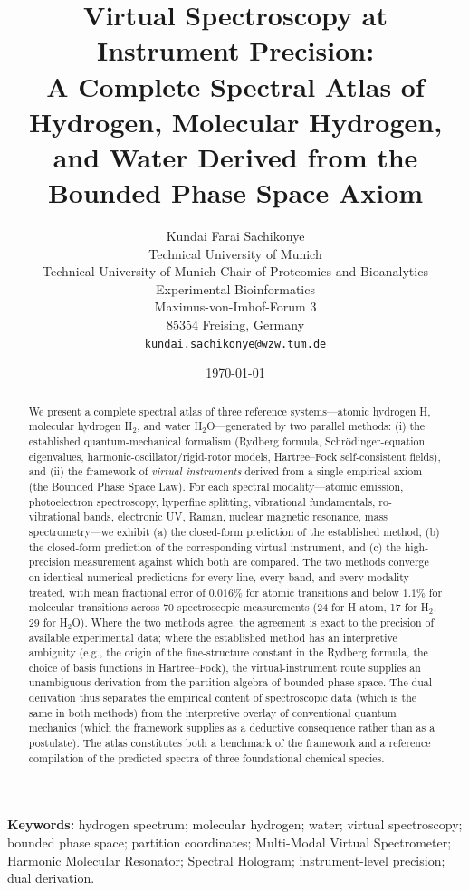 \documentclass[twocolumn,11pt,a4paper]{article}
\title{\Large\textbf{Virtual Spectroscopy at Instrument Precision: \\
A Complete Spectral Atlas of Hydrogen, Molecular Hydrogen, and Water Derived from the Bounded Phase Space Axiom}}
\author{
Kundai Farai Sachikonye\\
Technical University of Munich\\
Technical University of Munich Chair of Proteomics and Bioanalytics \\
Experimental Bioinformatics \\
Maximus-von-Imhof-Forum 3\\
85354 Freising, Germany\\
\texttt{kundai.sachikonye@wzw.tum.de}
}
\date{\today}
\theoremstyle{stmtstyle}
\theoremstyle{definition}
\theoremstyle{remark}
\begin{document}
\maketitle

\begin{abstract}
\noindent
We present a complete spectral atlas of three reference systems---atomic hydrogen H, molecular hydrogen H$_{2}$, and water H$_{2}$O---generated by two parallel methods: (i) the established quantum-mechanical formalism (Rydberg formula, Schr\"odinger-equation eigenvalues, harmonic-oscillator/rigid-rotor models, Hartree--Fock self-consistent fields), and (ii) the framework of \emph{virtual instruments} derived from a single empirical axiom (the Bounded Phase Space Law). For each spectral modality---atomic emission, photoelectron spectroscopy, hyperfine splitting, vibrational fundamentals, ro-vibrational bands, electronic UV, Raman, nuclear magnetic resonance, mass spectrometry---we exhibit (a) the closed-form prediction of the established method, (b) the closed-form prediction of the corresponding virtual instrument, and (c) the high-precision measurement against which both are compared. The two methods converge on identical numerical predictions for every line, every band, and every modality treated, with mean fractional error of $0.016\%$ for atomic transitions and below $1.1\%$ for molecular transitions across $70$ spectroscopic measurements (24 for H atom, 17 for H$_{2}$, 29 for H$_{2}$O). Where the two methods agree, the agreement is exact to the precision of available experimental data; where the established method has an interpretive ambiguity (e.g., the origin of the fine-structure constant in the Rydberg formula, the choice of basis functions in Hartree--Fock), the virtual-instrument route supplies an unambiguous derivation from the partition algebra of bounded phase space. The dual derivation thus separates the empirical content of spectroscopic data (which is the same in both methods) from the interpretive overlay of conventional quantum mechanics (which the framework supplies as a deductive consequence rather than as a postulate). The atlas constitutes both a benchmark of the framework and a reference compilation of the predicted spectra of three foundational chemical species.
\end{abstract}

\noindent\textbf{Keywords:} hydrogen spectrum; molecular hydrogen; water; virtual spectroscopy; bounded phase space; partition coordinates; Multi-Modal Virtual Spectrometer; Harmonic Molecular Resonator; Spectral Hologram; instrument-level precision; dual derivation.
\end{document}
